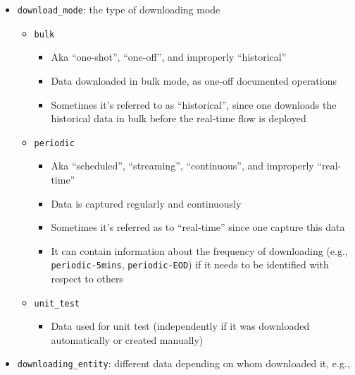 \documentclass[11pt, reqno]{amsart}
\theoremstyle{definition}
\theoremstyle{remark}
\begin{document}
\begin{itemize}
  \item \verb|download_mode|: the type of downloading mode

        \begin{itemize}
          \item \verb|bulk|

                \begin{itemize}
                  \item Aka ``one-shot'', ``one-off'', and improperly ``historical''
                  \item Data downloaded in bulk mode, as one-off documented operations
                  \item Sometimes it's referred to as ``historical'', since one downloads
                        the historical data in bulk before the real-time flow is deployed
                \end{itemize}

          \item \verb|periodic|
                \begin{itemize}
                  \item Aka ``scheduled'', ``streaming'', ``continuous'', and improperly
                        ``real-time''
                  \item Data is captured regularly and continuously
                  \item Sometimes it's referred as to ``real-time'' since one capture this
                        data
                  \item It can contain information about the frequency of downloading
                        (e.g., \verb|periodic-5mins|, \verb|periodic-EOD|) if it needs
                        to be identified with respect to others
                \end{itemize}

          \item \verb|unit_test|
                \begin{itemize}
                  \item Data used for unit test (independently if it was downloaded
                        automatically or created manually)
                \end{itemize}
        \end{itemize}

  \item \verb|downloading_entity|: different data depending on whom
        downloaded it, e.g.,


\end{itemize}
\end{document}
